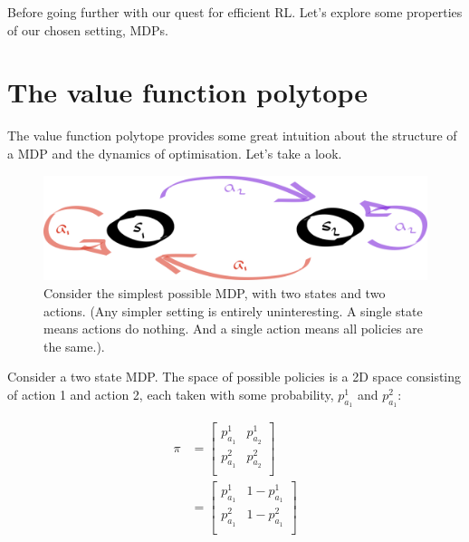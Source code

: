 
\newpage

Before going further with our quest for efficient RL. Let's explore some
properties of our chosen setting, MDPs.


\section{The value function polytope}

The value function polytope \cite{Dadashi2018} provides some great intuition
about the structure of a MDP and the dynamics of optimisation. Let's take a look.

\begin{figure}
\centering
\includegraphics[width=1\textwidth,height=0.25\textheight]{../../pictures/drawings/2-state-automata.png}
\caption{Consider the simplest possible MDP, with two states and two actions. (Any simpler setting is entirely uninteresting. A single state means actions do nothing.
And a single action means all policies are the same.).}
\end{figure}

Consider a two state MDP. The space of possible policies is a 2D space
consisting of action 1 and action 2, each taken with some probability, $p^1_{a_1}$ and $p^2_{a_1}$:

\begin{align}
\pi &=
\begin{bmatrix}
  p^1_{a_1} & p^1_{a_2} \\
  p^2_{a_1} & p^2_{a_2}\\
\end{bmatrix} \\
&=
\begin{bmatrix}
p^1_{a_1} & 1-p^1_{a_1} \\
p^2_{a_1} & 1-p^2_{a_1}\\
\end{bmatrix}
\end{align}

